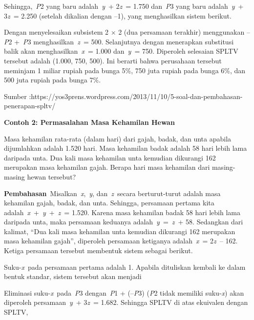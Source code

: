 \documentclass[11pt,fleqn]{book} %
\begin{document}
\noindent 

\noindent Sehingga,~\textit{P}2 yang baru adalah~\textit{y}~+ 2\textit{z}~= 1.750 dan~\textit{P}3 yang baru adalah~\textit{y}~+ 3\textit{z}~= 2.250 (setelah dikalian dengan --1), yang menghasilkan sistem berikut.

\noindent 

\noindent 

\noindent Dengan menyelesaikan subsistem 2 $\times$ 2 (dua persamaan terakhir) menggunakan --\textit{P}2 +~\textit{P}3 menghasilkan~\textit{z}~= 500. Selanjutnya dengan menerapkan substitusi balik akan menghasilkan~\textit{x}~= 1.000 dan~\textit{y}~= 750. Diperoleh selesaian SPLTV tersebut adalah (1.000, 750, 500). Ini berarti bahwa perusahaan tersebut meminjam 1 miliar rupiah pada bunga 5\%, 750 juta rupiah pada bunga 6\%, dan 500 juta rupiah pada bunga 7\%.

\noindent Sumber :https://yos3prens.wordpress.com/2013/11/10/5-soal-dan-pembahasan-penerapan-spltv/

\noindent \textbf{}

\noindent \textbf{Contoh 2: Permasalahan Masa Kehamilan Hewan}

\noindent Masa kehamilan rata-rata (dalam hari) dari gajah, badak, dan unta apabila dijumlahkan adalah 1.520 hari. Masa kehamilan badak adalah 58 hari lebih lama daripada unta. Dua kali masa kehamilan unta kemudian dikurangi 162 merupakan masa kehamilan gajah. Berapa hari masa kehamilan dari masing-masing hewan tersebut?

\noindent \textbf{}

\noindent \textbf{Pembahasan}~Misalkan~\textit{x},~\textit{y}, dan~\textit{z}~secara berturut-turut adalah masa kehamilan gajah, badak, dan unta. Sehingga, persamaan pertama kita adalah~\textit{x}~+~\textit{y}~+~\textit{z}~= 1.520. Karena masa kehamilan badak 58 hari lebih lama daripada unta, maka persamaan keduanya adalah~\textit{y}~=~\textit{z}~+ 58. Sedangkan dari kalimat, ``Dua kali masa kehamilan unta kemudian dikurangi 162 merupakan masa kehamilan gajah'', diperoleh persamaan ketiganya adalah~\textit{x}~= 2\textit{z}~-- 162. Ketiga persamaan tersebut membentuk sistem sebagai berikut.

\noindent Suku-\textit{x}~pada persamaan pertama adalah 1. Apabila dituliskan kembali ke dalam bentuk standar, sistem tersebut akan menjadi

\noindent 

\noindent 

\noindent Eliminasi suku-\textit{x}~pada~\textit{P}3 dengan~\textit{P}1 + (--\textit{P}3) (\textit{P}2 tidak memiliki suku-\textit{x}) akan diperoleh persamaan~\textit{y}~+ 3\textit{z}~= 1.682. Sehingga SPLTV di atas ekuivalen dengan SPLTV,
\end{document}
